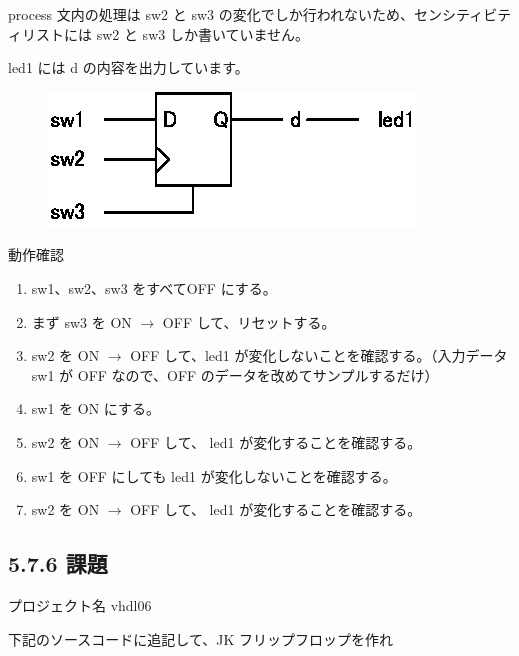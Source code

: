 \documentclass[letterpaper,10pt,dvipdfmx]{sphinxmanual}
\begin{document}
process 文内の処理は sw2 と sw3 の変化でしか行われないため、センシティビティリストには sw2 と sw3 しか書いていません。

led1 には d の内容を出力しています。
\begin{figure}[htbp]
\centering

\includegraphics{figure13.eps}
\end{figure}

動作確認
\begin{enumerate}
\item {} 
sw1、sw2、sw3 をすべてOFF にする。

\item {} 
まず sw3 を ON \(\rightarrow\) OFF して、リセットする。

\item {} 
sw2 を ON \(\rightarrow\) OFF して、led1 が変化しないことを確認する。（入力データ sw1 が OFF なので、OFF のデータを改めてサンプルするだけ）

\item {} 
sw1 を ON にする。

\item {} 
sw2 を ON \(\rightarrow\) OFF して、 led1 が変化することを確認する。

\item {} 
sw1 を OFF にしても led1 が変化しないことを確認する。

\item {} 
sw2 を ON \(\rightarrow\) OFF して、 led1 が変化することを確認する。

\end{enumerate}


\subsection{5.7.6 課題}
\label{05_try:id13}
プロジェクト名 vhdl06

下記のソースコードに追記して、JK フリップフロップを作れ
\end{document}
